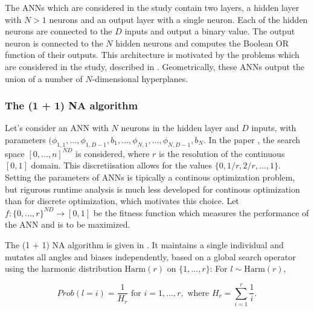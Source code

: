 
The ANNs which are considered in the study contain two layers, a hidden layer with $N > 1$ neurons and an output layer with a single neuron.
Each of the hidden neurons are connected to the $D$ inputs and output a binary value. The output neuron is connected to the $N$ hidden neurons and
computes the Boolean OR function of their outputs.
This architecture is motivated by the problems which are considered in the study, described in .
Geometrically, these ANNs output the union of a number of $N$-dimensional hyperplanes.


\subsubsection{The (1 + 1) NA algorithm}

Let's consider an ANN with $N$ neurons in the hidden layer and $D$ inputs, with parameters
$(\phi_{1,1}, \dots, \phi_{1,D-1}, b_1, \dots, \phi_{N,1}, \dots, \phi_{N,D-1}, b_N$.
In the paper \cite{na}, the search space $[0 , \dots, n]^{N D}$ is considered, where $r$ is the resolution of the continuous $[0, 1]$ domain.
This discretiisation allows for the values $\{0, 1/r, 2/r, \dots, 1\}$. Setting the parameters of ANNs is tipically a continous optimization problem,
but rigurous runtime analysis is much less developed for continous optimization than for discrete optimization, which motivates this choice.
Let $f : \{0 , \dots, r\}^{N D} \to [0, 1]$ be the fitness function which measures the performance of the ANN and is to be maximized.

The (1 + 1) NA algorithm is given in .
It maintains a single individual and mutates all angles and biases independently, based on a global search operator using the harmonic distribution
$\text{Harm}(r)$ on $\{1, \dots, r\}$: For $l \sim \text{Harm}(r)$,

\[
    Prob(l = i) = \frac{1}{H_r} \text{ for } i = 1, \dots, r, \text{ where } H_r = \sum_{i=1}^r \frac{1}{i}.
\]

